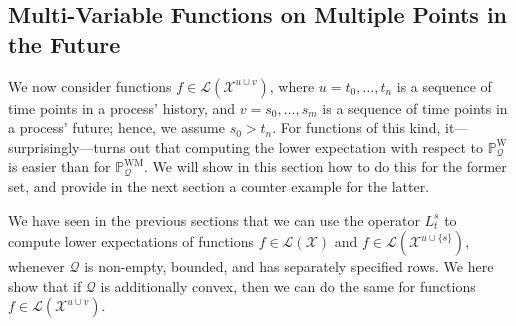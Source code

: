 \documentclass[10pt,a4paper]{paper}
\theoremstyle{definition}
\newcommand{\states}{\mathcal{X}}
\newcommand{\processes}{\mathbb{P}}
\newcommand{\wprocesses}{\processes^{\mathrm{W}}}
\newcommand{\wmprocesses}{\processes^{\mathrm{WM}}}
\newcommand{\gambles}{\mathcal{L}}
\newcommand{\gamblesX}{\gambles(\states)}
\newcommand{\rateset}{\mathcal{Q}}
\begin{document}
\subsection{Multi-Variable Functions on Multiple Points in the Future}\label{sec:decomposition}

We now consider functions $f\in\gambles(\states^{u\cup v})$, where $u=t_0,\ldots,t_n$ is a sequence of time points in a process' history, and $v=s_0,\ldots,s_m$ is a sequence of time points in a process' future; hence, we assume $s_0>t_n$. For functions of this kind, it---surprisingly---turns out that computing the lower expectation with respect to $\wprocesses_\rateset$ is easier than for $\wmprocesses_\rateset$. We will show in this section how to do this for the former set, and provide in the next section a counter example for the latter.

We have seen in the previous sections that we can use the operator $L_t^s$ to compute lower expectations of functions $f\in\gamblesX$ and $f\in\gambles(\states^{u\cup\{s\}})$, whenever $\rateset$ is non-empty, bounded, and has separately specified rows. We here show that if $\rateset$ is additionally convex, then we can do the same for functions $f\in\gambles(\states^{u\cup v})$.
\end{document}
